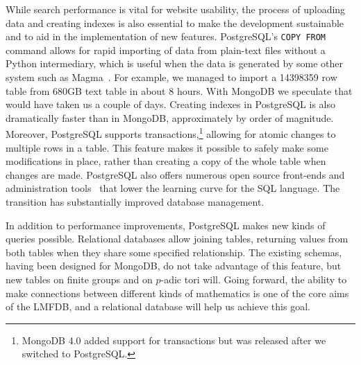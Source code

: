 \documentclass{article}
\begin{document}
While search performance is vital for website usability, the process of uploading data and creating indexes is also essential to make the development sustainable and to aid in the implementation of new features.
PostgreSQL's \texttt{COPY FROM} command allows for rapid importing of data from plain-text files without a Python intermediary, which is useful when the data is generated by some other system such as Magma~\cite{magma}.
For example, we managed to import a \num{14398359} row table from 680GB text table in about 8 hours.
With MongoDB we speculate that would have taken us a couple of days.
Creating indexes in PostgreSQL is also dramatically faster than in MongoDB, approximately by order of magnitude.
Moreover, PostgreSQL supports transactions,\footnote{MongoDB 4.0 added support for transactions but was released after we switched to PostgreSQL.} allowing for atomic changes to multiple rows in a table.
This feature makes it possible to safely make some modifications in place, rather than creating a copy of the whole table when changes are made.
PostgreSQL also offers numerous open source front-ends and administration tools~\cite{pgadmin,adminer} that lower the learning curve for the SQL language.
The transition has substantially improved database management.

In addition to performance improvements, PostgreSQL makes new kinds of queries possible.
Relational databases allow joining tables, returning values from both tables when they share some specified relationship.
The existing schemas, having been designed for MongoDB, do not take advantage of this feature, but new tables on finite groups and on $p$-adic tori will.
Going forward, the ability to make connections between different kinds of mathematics is one of the core aims of the LMFDB, and a relational database will help us achieve this goal.
\end{document}

